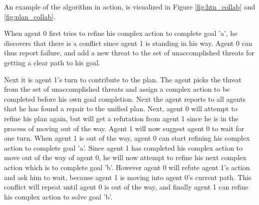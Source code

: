\documentclass[Main]{subfiles}
\begin{document}
An example of the algorithm in action, is visualized in Figure \ref{fig:htn_collab} and \ref{fig:plan_collab}.

When agent 0 first tries to refine his complex action to complete goal 'a', he discovers that there is a conflict since agent 1 is standing in his way.
Agent 0 can thus report failure, and add a new threat to the set of unaccomplished threats for getting a clear path to his goal.

Next it is agent 1's turn to contribute to the plan. The agent picks the threat from the set of unaccomplished threats and assign a complex action to be completed before his own goal completion. Next the agent reports to all agents that he has found a repair to the unified plan.
Next, agent 0 will attempt to refine his plan again, but will get a refutation from agent 1 since he is in the process of moving out of the way.
Agent 1 will now suggest agent 0 to wait for one turn.
When agent 1 is out of the way, agent 0 can start refining his complex action to complete goal 'a'.
Since agent 1 has completed his complex action to move out of the way of agent 0, he will now attempt to refine his next complex action which is to complete goal 'b'.
However agent 0 will refute agent 1's action and ask him to wait, because agent 1 is moving into agent 0's current path.
This conflict will repeat until agent 0 is out of the way, and finally agent 1 can refine his complex action to solve goal 'b'.




\end{document}
